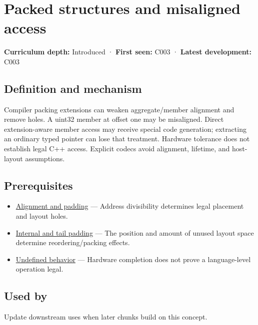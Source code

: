 \hypertarget{appendix-0682dbfc5f0e}{}\label{referencestart:appendix-0682dbfc5f0e}
\section{Packed structures and misaligned access}\label{appendix-0682dbfc5f0e-packed-structures-and-misaligned-access}

\textbf{Curriculum depth:} Introduced · \textbf{First seen:} C003 · \textbf{Latest development:} C003

\subsection{Definition and mechanism}\label{appendix-0682dbfc5f0e-definition-and-mechanism}

Compiler packing extensions can weaken aggregate/member alignment and remove holes. A uint32 member at offset one may be misaligned. Direct extension-aware member access may receive special code generation; extracting an ordinary typed pointer can lose that treatment. Hardware tolerance does not establish legal C++ access. Explicit codecs avoid alignment, lifetime, and host-layout assumptions.

\subsection{Prerequisites}\label{appendix-0682dbfc5f0e-prerequisites}

\begin{itemize}
\tightlist
\item
  \hyperref[appendix-a1f7c53b4742]{Alignment and padding} --- Address divisibility determines legal placement and layout holes.
\item
  \hyperref[appendix-f52f8c5a3afd]{Internal and tail padding} --- The position and amount of unused layout space determine reordering/packing effects.
\item
  \hyperref[appendix-f558f5b4d8f2]{Undefined behavior} --- Hardware completion does not prove a language-level operation legal.
\end{itemize}

\subsection{Used by}\label{appendix-0682dbfc5f0e-used-by}

Update downstream uses when later chunks build on this concept.


